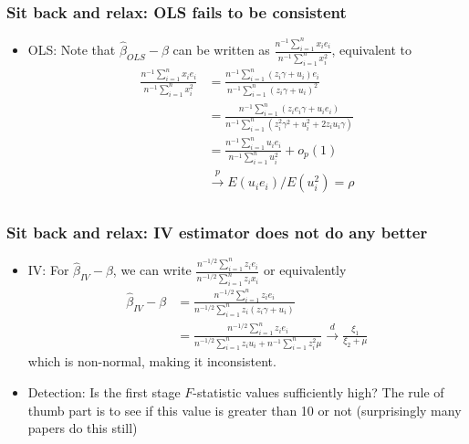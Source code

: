 \documentclass[aspectratio=169]{beamer}
\begin{document}
\begin{frame}
\frametitle{Sit back and relax: OLS fails to be consistent}
\begin{itemize}
\item  OLS: Note that $\hat{\beta}_{OLS}-\beta$ can be written as $\frac{n^{-1}\sum_{i=1}^n x_ie_i}{n^{-1}\sum_{i=1}^nx_i^2}$, equivalent to
\footnotesize{\[
\begin{aligned}
\frac{n^{-1}\sum_{i=1}^n x_ie_i}{n^{-1}\sum_{i=1}^nx_i^2}&=\frac{n^{-1}\sum_{i=1}^n (z_i\gamma+u_i)e_i}{n^{-1}\sum_{i=1}^n(z_i\gamma+u_i)^2}\\
&=\frac{n^{-1}\sum_{i=1}^n (z_ie_i\gamma+u_ie_i)}{n^{-1}\sum_{i=1}^n(z_i^2\gamma^2+u_i^2+2z_iu_i\gamma)}\\
&=\frac{n^{-1}\sum_{i=1}^n u_ie_i}{n^{-1}\sum_{i=1}^nu_i^2}+o_p(1)\\
&\xrightarrow{p}E(u_ie_i)/E(u_i^2)=\rho\\
\end{aligned}
\]}\normalsize
\end{itemize}
\end{frame}

\begin{frame}
\frametitle{Sit back and relax: IV estimator does not do any better}
\begin{itemize}
\item  IV: For $\hat{\beta}_{IV}-\beta$, we can write $\frac{n^{-1/2}\sum_{i=1}^n z_ie_i}{n^{-1/2}\sum_{i=1}^nz_ix_i}$ or equivalently
\footnotesize{\[
\begin{aligned}
\hat{\beta}_{IV}-\beta&=\frac{n^{-1/2}\sum_{i=1}^n z_ie_i}{n^{-1/2}\sum_{i=1}^nz_i(z_i\gamma+u_i)}\\
&=\frac{n^{-1/2}\sum_{i=1}^n z_ie_i}{n^{-1/2}\sum_{i=1}^nz_iu_i+n^{-1}\sum_{i=1}^n z_i^2\mu}\xrightarrow{d}\frac{\xi_1}{\xi_2+\mu}
\end{aligned}
\]}\normalsize
which is non-normal, making it inconsistent. 
\item Detection: Is the first stage $F$-statistic values sufficiently high? The rule of thumb part is to see if this value is greater than 10 or not (surprisingly many papers do this still)
\end{itemize}
\end{frame}
\end{document}
